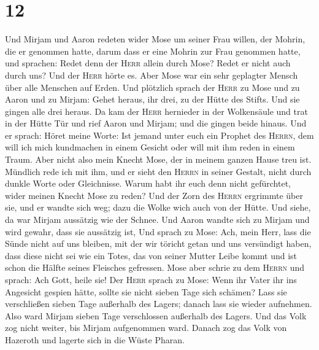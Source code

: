 \hypertarget{section-11}{%
\section{12}\label{section-11}}

 Und Mirjam und Aaron redeten wider Mose um seiner Frau
willen, der Mohrin, die er genommen hatte, darum dass er eine Mohrin zur
Frau genommen hatte,  und sprachen: Redet denn der
\textsc{Herr} allein durch Mose? Redet er nicht auch durch uns? Und der
\textsc{Herr} hörte es.  Aber Mose war ein sehr geplagter
Mensch über alle Menschen auf Erden.  Und plötzlich sprach
der \textsc{Herr} zu Mose und zu Aaron und zu Mirjam: Gehet heraus, ihr
drei, zu der Hütte des Stifts. Und sie gingen alle drei heraus.
 Da kam der \textsc{Herr} hernieder in der Wolkensäule und
trat in der Hütte Tür und rief Aaron und Mirjam; und die gingen beide
hinaus.  Und er sprach: Höret meine Worte: Ist jemand
unter euch ein Prophet des \textsc{Herrn}, dem will ich mich kundmachen
in einem Gesicht oder will mit ihm reden in einem Traum. 
Aber nicht also mein Knecht Mose, der in meinem ganzen Hause treu ist.
 Mündlich rede ich mit ihm, und er sieht den
\textsc{Herrn} in seiner Gestalt, nicht durch dunkle Worte oder
Gleichnisse. Warum habt ihr euch denn nicht gefürchtet, wider meinen
Knecht Mose zu reden?  Und der Zorn des \textsc{Herrn}
ergrimmte über sie, und er wandte sich weg;  dazu die
Wolke wich auch von der Hütte. Und siehe, da war Mirjam aussätzig wie
der Schnee. Und Aaron wandte sich zu Mirjam und wird gewahr, dass sie
aussätzig ist,  Und sprach zu Mose: Ach, mein Herr, lass
die Sünde nicht auf uns bleiben, mit der wir töricht getan und uns
versündigt haben,  dass diese nicht sei wie ein Totes,
das von seiner Mutter Leibe kommt und ist schon die Hälfte seines
Fleisches gefressen.  Mose aber schrie zu dem
\textsc{Herrn} und sprach: Ach Gott, heile sie!  Der
\textsc{Herr} sprach zu Mose: Wenn ihr Vater ihr ins Angesicht gespien
hätte, sollte sie nicht sieben Tage sich schämen? Lass sie verschließen
sieben Tage außerhalb des Lagers; danach lass sie wieder aufnehmen.
 Also ward Mirjam sieben Tage verschlossen außerhalb des
Lagers. Und das Volk zog nicht weiter, bis Mirjam aufgenommen ward.
 Danach zog das Volk von Hazeroth und lagerte sich in die
Wüste Pharan.

